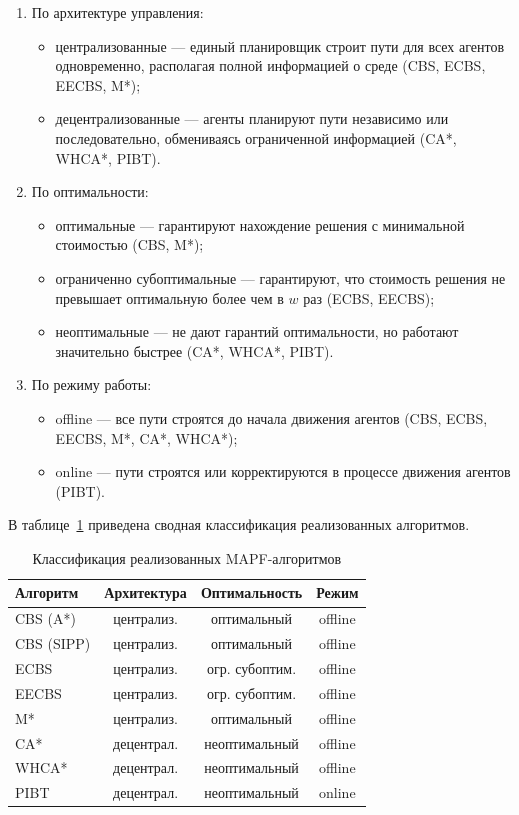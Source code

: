\begin{enumerate}[arabic]
    \item По архитектуре управления:
    \begin{itemize}
        \item централизованные --- единый планировщик строит пути для всех агентов одновременно, располагая полной информацией о среде (CBS, ECBS, EECBS, M*);
        \item децентрализованные --- агенты планируют пути независимо или последовательно, обмениваясь ограниченной информацией (CA*, WHCA*, PIBT).
    \end{itemize}
    \item По оптимальности:
    \begin{itemize}
        \item оптимальные --- гарантируют нахождение решения с минимальной стоимостью (CBS, M*);
        \item ограниченно субоптимальные --- гарантируют, что стоимость решения не превышает оптимальную более чем в $w$ раз (ECBS, EECBS);
        \item неоптимальные --- не дают гарантий оптимальности, но работают значительно быстрее (CA*, WHCA*, PIBT).
    \end{itemize}
    \item По режиму работы:
    \begin{itemize}
        \item offline --- все пути строятся до начала движения агентов (CBS, ECBS, EECBS, M*, CA*, WHCA*);
        \item online --- пути строятся или корректируются в процессе движения агентов (PIBT).
    \end{itemize}
\end{enumerate}

В таблице~\ref{tab:mapf_classification} приведена сводная классификация реализованных алгоритмов.

\begin{table}
    \caption{Классификация реализованных MAPF-алгоритмов}
    \begin{tabularx}{\textwidth}{|X|c|c|c|}\hline
    Алгоритм & Архитектура & Оптимальность & Режим \\ \hline
    CBS (A*)     & централиз. & оптимальный         & offline \\ \hline
    CBS (SIPP)   & централиз. & оптимальный         & offline \\ \hline
    ECBS         & централиз. & огр. субоптим.      & offline \\ \hline
    EECBS        & централиз. & огр. субоптим.      & offline \\ \hline
    M*           & централиз. & оптимальный         & offline \\ \hline
    CA*          & децентрал. & неоптимальный       & offline \\ \hline
    WHCA*        & децентрал. & неоптимальный       & offline \\ \hline
    PIBT         & децентрал. & неоптимальный       & online  \\ \hline
    \end{tabularx}
    \label{tab:mapf_classification}
\end{table}

